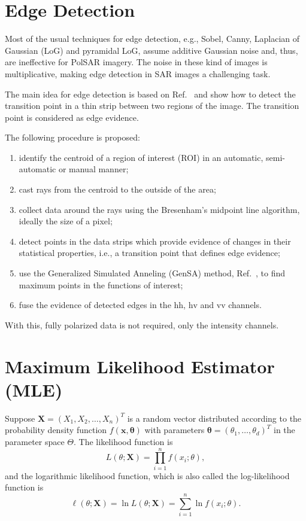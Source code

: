 \documentclass[conference]{IEEEtran}
\begin{document}
\section{Edge Detection}\label{sec_04}

Most of the usual techniques for edge detection, e.g., 
Sobel, Canny, Laplacian of Gaussian (LoG) and pyramidal LoG, assume additive Gaussian noise and, thus, are ineffective for PolSAR imagery.
The noise in these kind of images is multiplicative, making edge detection in SAR images a challenging task.

The main idea for edge detection is based on Ref.~\cite{nhfc, gmbf} and show how to detect the transition point in a thin strip between two regions of the image. The transition point is considered as edge evidence. 

The following procedure is proposed:
\begin{enumerate}
	\item identify the centroid of a region of interest (ROI) in an automatic, semi-automatic or manual manner;
	\item cast rays from the centroid to the outside of the area;
	\item collect data around the rays using the  Bresenham's midpoint line algorithm, ideally the size of a pixel;
	\item detect points in the data strips which provide evidence of changes in their statistical properties, i.e., a transition point that defines edge evidence;
	\item use the Generalized Simulated Anneling (GenSA) method, Ref.~\cite{xgsh}, to find maximum points in the functions of interest;
	\item fuse the evidence of detected edges in the $\text{hh}$, $\text{hv}$ and $\text{vv}$ channels.
\end{enumerate}
With this, fully polarized data is not required, only the intensity channels.

\section{Maximum Likelihood Estimator (MLE)}\label{sec_05}

Suppose $\mathbf{X}=(X_1,X_2,\dots,X_n)^T$ is a random vector distributed according to the probability density function $f(\mathbf{x},\mathbf{\theta})$ with parameters $\mathbf{\theta}=(\theta_1,\dots,\theta_d)^T$ in the parameter space $\Theta$.
The likelihood function is
\begin{equation*}
    L(\theta;\mathbf{X}) = \prod_{i=1}^{n}f(x_i;\theta),
\end{equation*}
and the logarithmic likelihood function, which is also called the log-likelihood function is
\begin{equation}
	\ell(\theta;\mathbf{X})= \ln L(\theta;\mathbf{X}) = \sum_{i=1}^{n}\ln f(x_i;\theta).
	\label{eq_05}
\end{equation}
\end{document}

